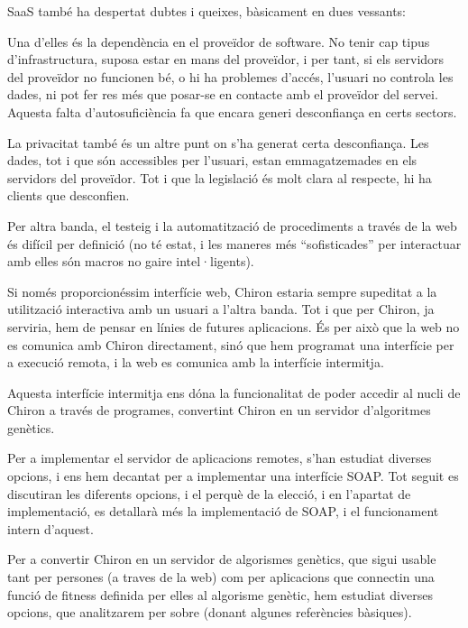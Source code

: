 SaaS també ha despertat dubtes i queixes, bàsicament en dues vessants:

Una d'elles és la dependència en el proveïdor de software.  No tenir cap tipus
d'infrastructura, suposa estar en mans del proveïdor, i per tant, si els
servidors del proveïdor no funcionen bé, o hi ha problemes d'accés, l'usuari
no controla les dades, ni pot fer res més que posar-se en contacte amb el
proveïdor del servei.  Aquesta falta d'autosuficiència fa que encara generi
desconfiança en certs sectors.

La privacitat també és un altre punt on s'ha generat certa desconfiança.  Les
dades, tot i que són accessibles per l'usuari, estan emmagatzemades en els
servidors del proveïdor.  Tot i que la legislació és molt clara al respecte,
hi ha clients que desconfien.

Per altra banda, el testeig i la automatització de procediments a través de la
web és difícil per definició (no té estat, i les maneres més ``sofisticades''
per interactuar amb elles són macros no gaire intel·ligents).

Si només proporcionéssim interfície web, Chiron estaria sempre supeditat a la
utilització interactiva amb un usuari a l'altra banda.  Tot i que per Chiron, ja
serviria, hem de pensar en línies de futures aplicacions.  És per això que la
web no es comunica amb Chiron directament, sinó que hem programat una interfície
per a execució remota, i la web es comunica amb la interfície intermitja.

Aquesta interfície intermitja ens dóna la funcionalitat de poder accedir al
nucli de Chiron a través de programes, convertint Chiron en un servidor 
d'algoritmes genètics.

Per a implementar el servidor de aplicacions remotes, s'han estudiat diverses
opcions, i ens hem decantat per a implementar una interfície SOAP.  Tot seguit
es discutiran les diferents opcions, i el perquè de la elecció, i en l'apartat
de implementació, es detallarà més la implementació de SOAP, i el funcionament
intern d'aquest.


Per a convertir Chiron en un servidor de algorismes genètics, que sigui usable
tant per persones (a traves de la web) com per aplicacions que connectin una
funció de fitness definida per elles al algorisme genètic, hem estudiat diverses
opcions, que analitzarem per sobre (donant algunes referències bàsiques).

